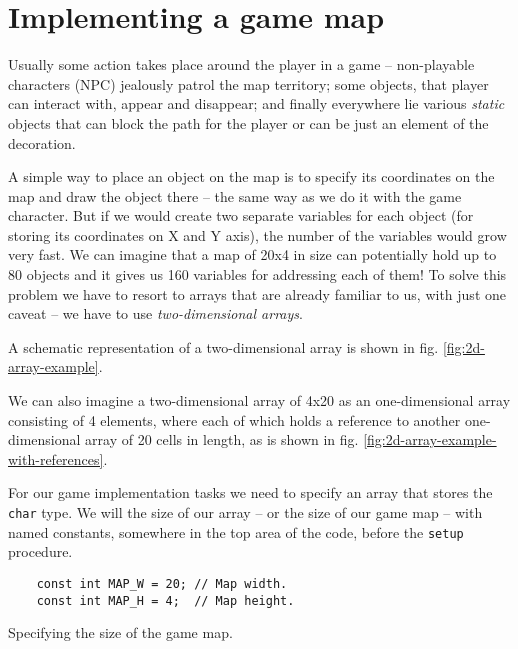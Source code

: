 \documentclass[../sparc.tex]{subfiles}
\begin{document}
\section{Implementing a game map}
\label{section:game-map}

Usually some action takes place around the player in a game -- non-playable
characters (NPC) jealously patrol the map territory; some objects, that player
can interact with, appear and disappear; and finally everywhere lie various
\emph{static} objects that can block the path for the player or can be just an
element of the decoration.

A simple way to place an object on the map is to specify its coordinates on the
map and draw the object there -- the same way as we do it with the game
character.  But if we would create two separate variables for each object (for
storing its coordinates on X and Y axis), the number of the variables would grow
very fast.  We can imagine that a map of 20x4 in size can potentially hold up to
80 objects and it gives us 160 variables for addressing each of them!  To solve
this problem we have to resort to arrays that are already familiar to us, with
just one caveat -- we have to use \emph{two-dimensional arrays}.

A schematic representation of a two-dimensional array is shown in
fig. \ref{fig:2d-array-example}.


We can also imagine a two-dimensional array of 4x20 as an one-dimensional array
consisting of 4 elements, where each of which holds a reference to another
one-dimensional array of 20 cells in length, as is shown in
fig. \ref{fig:2d-array-example-with-references}.


For our game implementation tasks we need to specify an array that stores the
\texttt{char} type.  We will the size of our array -- or the size of our
game map -- with named constants, somewhere in the top area of the code, before
the \texttt{setup} procedure.

\begin{listing}[H]
  \begin{verbatim}
    const int MAP_W = 20; // Map width.
    const int MAP_H = 4;  // Map height.
  \end{verbatim}
  \caption{Specifying the size of the game map.}
  \label{listing:game-dev-map-size}
\end{listing}
\end{document}

